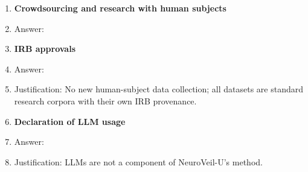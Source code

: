 \begin{enumerate}
\item {\bf Crowdsourcing and research with human subjects}
    \item[] Answer: \answerNA{}

\item {\bf IRB approvals}
    \item[] Answer: \answerNA{}
    \item[] Justification: No new human-subject data collection; all datasets are standard research corpora with their own IRB provenance.

\item {\bf Declaration of LLM usage}
    \item[] Answer: \answerNA{}
    \item[] Justification: LLMs are not a component of NeuroVeil-U's method.

\end{enumerate}
